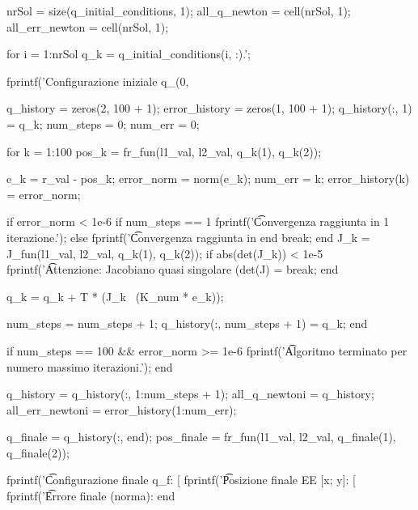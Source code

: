 \documentclass[11pt, a4paper]{article}
\begin{document}
\begin{matlabcode}
nrSol = size(q_initial_conditions, 1);
all_q_newton = cell(nrSol, 1);
all_err_newton = cell(nrSol, 1);

for i = 1:nrSol
    q_k = q_initial_conditions(i, :).'; %

    fprintf('Configurazione iniziale q_(0,%

    q_history = zeros(2, 100 + 1);
    error_history = zeros(1, 100 + 1);
    q_history(:, 1) = q_k;
    num_steps = 0;
    num_err = 0;

    for k = 1:100
        pos_k = fr_fun(l1_val, l2_val, q_k(1), q_k(2));

        e_k = r_val - pos_k;
        error_norm = norm(e_k);
        num_err = k;
        error_history(k) = error_norm;

        if error_norm < 1e-6
            if num_steps == 1
                fprintf('\t Convergenza raggiunta in 1 iterazione.\n');
            else
                fprintf('\t Convergenza raggiunta in %
            end
            break;
        end
        J_k = J_fun(l1_val, l2_val, q_k(1), q_k(2));
        if abs(det(J_k)) < 1e-5
            fprintf('\t Attenzione: Jacobiano quasi singolare (det(J) = %
            break;
        end

        q_k = q_k + T * (J_k \ (K_num * e_k));

        num_steps = num_steps + 1;
        q_history(:, num_steps + 1) = q_k;
    end

    if num_steps == 100 && error_norm >= 1e-6
        fprintf('\t Algoritmo terminato per numero massimo iterazioni.\n');
    end

    q_history = q_history(:, 1:num_steps + 1);
    all_q_newton{i} = q_history;
    all_err_newton{i} = error_history(1:num_err);

    q_finale = q_history(:, end);
    pos_finale = fr_fun(l1_val, l2_val, q_finale(1), q_finale(2));

    fprintf('\t Configurazione finale q_f: [%
    fprintf('\t Posizione finale EE [x; y]: [%
    fprintf('\t Errore finale (norma): %
end
\end{matlabcode}
\end{document}
